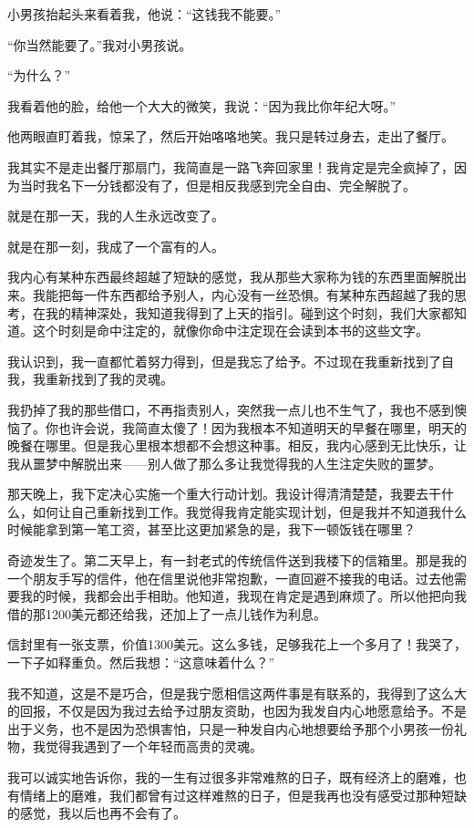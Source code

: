 小男孩抬起头来看着我，他说：“这钱我不能要。”

“你当然能要了。”我对小男孩说。

“为什么？”

我看着他的脸，给他一个大大的微笑，我说：“因为我比你年纪大呀。”

他两眼直盯着我，惊呆了，然后开始咯咯地笑。我只是转过身去，走出了餐厅。

我其实不是走出餐厅那扇门，我简直是一路飞奔回家里！我肯定是完全疯掉了，因为当时我名下一分钱都没有了，但是相反我感到完全自由、完全解脱了。

就是在那一天，我的人生永远改变了。

就是在那一刻，我成了一个富有的人。

我内心有某种东西最终超越了短缺的感觉，我从那些大家称为钱的东西里面解脱出来。我能把每一件东西都给予别人，内心没有一丝恐惧。有某种东西超越了我的思考，在我的精神深处，我知道我得到了上天的指引。碰到这个时刻，我们大家都知道。这个时刻是命中注定的，就像你命中注定现在会读到本书的这些文字。

我认识到，我一直都忙着努力得到，但是我忘了给予。不过现在我重新找到了自我，我重新找到了我的灵魂。

我扔掉了我的那些借口，不再指责别人，突然我一点儿也不生气了，我也不感到懊恼了。你也许会说，我简直太傻了！因为我根本不知道明天的早餐在哪里，明天的晚餐在哪里。但是我心里根本想都不会想这种事。相反，我内心感到无比快乐，让我从噩梦中解脱出来——别人做了那么多让我觉得我的人生注定失败的噩梦。

那天晚上，我下定决心实施一个重大行动计划。我设计得清清楚楚，我要去干什么，如何让自己重新找到工作。我觉得我肯定能实现计划，但是我并不知道我什么时候能拿到第一笔工资，甚至比这更加紧急的是，我下一顿饭钱在哪里？

奇迹发生了。第二天早上，有一封老式的传统信件送到我楼下的信箱里。那是我的一个朋友手写的信件，他在信里说他非常抱歉，一直回避不接我的电话。过去他需要我的时候，我都会出手相助。他知道，我现在肯定是遇到麻烦了。所以他把向我借的那1200美元都还给我，还加上了一点儿钱作为利息。

信封里有一张支票，价值1300美元。这么多钱，足够我花上一个多月了！我哭了，一下子如释重负。然后我想：“这意味着什么？”

我不知道，这是不是巧合，但是我宁愿相信这两件事是有联系的，我得到了这么大的回报，不仅是因为我过去给予过朋友资助，也因为我发自内心地愿意给予。不是出于义务，也不是因为恐惧害怕，只是一种发自内心地想要给予那个小男孩一份礼物，我觉得我遇到了一个年轻而高贵的灵魂。

我可以诚实地告诉你，我的一生有过很多非常难熬的日子，既有经济上的磨难，也有情绪上的磨难，我们都曾有过这样难熬的日子，但是我再也没有感受过那种短缺的感觉，我以后也再不会有了。

